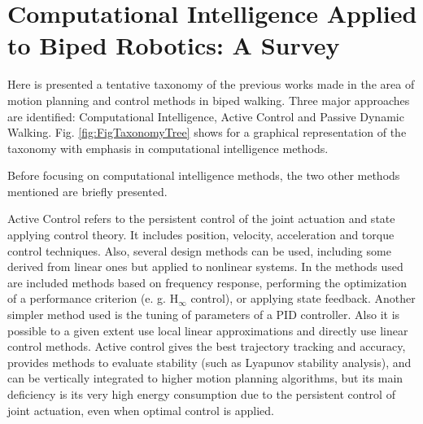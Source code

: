 \section{Computational Intelligence Applied to Biped Robotics: A Survey}

Here is presented a tentative taxonomy of the previous works made in the area of motion planning and control methods in biped walking. Three major approaches are identified: Computational Intelligence, Active Control and Passive Dynamic Walking. Fig. \ref{fig:FigTaxonomyTree} shows for a graphical representation of the taxonomy with emphasis in computational intelligence methods.


Before focusing on computational intelligence methods, the two other methods mentioned are briefly presented. 


Active Control refers to the persistent control of the joint actuation
and state applying control theory. It includes position, velocity,
acceleration and torque control techniques. Also, several design
methods can be used, including some derived from linear ones but
applied to nonlinear systems. In the methods used are included methods
based on frequency response, performing the optimization of a
performance criterion (e. g. H$_\infty$ control), or applying state
feedback. Another simpler method used is the tuning of parameters of a
PID controller. Also it is possible to a given extent use local linear
approximations and directly use linear control methods. Active control
gives the best trajectory tracking and accuracy, provides methods to
evaluate stability (such as Lyapunov stability analysis), and can be
vertically integrated to higher motion planning algorithms, but its
main deficiency is its very high energy consumption due to the
persistent control of joint actuation, even when optimal control is
applied.

